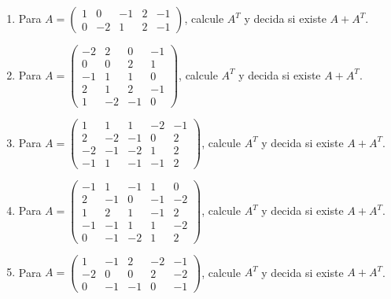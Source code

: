 \documentclass[12pt]{article}
\theoremstyle{remark}
\newcounter{contadorEjercicio}
\newenvironment{listaejercicios}{\begin{enumerate}[label=\textbf{E\arabic*.},leftmargin=2.4em,itemsep=0.52em]\setcounter{enumi}{\value{contadorEjercicio}}}{\setcounter{contadorEjercicio}{\value{enumi}}\end{enumerate}}
\begin{document}
\begin{listaejercicios}
\item Para $A=\begin{pmatrix}1&0&-1&2&-1\\0&-2&1&2&-1\end{pmatrix}$, calcule $A^T$ y decida si existe $A+A^T$.

\item Para $A=\begin{pmatrix}-2&2&0&-1\\0&0&2&1\\-1&1&1&0\\2&1&2&-1\\1&-2&-1&0\end{pmatrix}$, calcule $A^T$ y decida si existe $A+A^T$.

\item Para $A=\begin{pmatrix}1&1&1&-2&-1\\2&-2&-1&0&2\\-2&-1&-2&1&2\\-1&1&-1&-1&2\end{pmatrix}$, calcule $A^T$ y decida si existe $A+A^T$.

\item Para $A=\begin{pmatrix}-1&1&-1&1&0\\2&-1&0&-1&-2\\1&2&1&-1&2\\-1&-1&1&1&-2\\0&-1&-2&1&2\end{pmatrix}$, calcule $A^T$ y decida si existe $A+A^T$.

\item Para $A=\begin{pmatrix}1&-1&2&-2&-1\\-2&0&0&2&-2\\0&-1&-1&0&-1\end{pmatrix}$, calcule $A^T$ y decida si existe $A+A^T$.

\end{listaejercicios}
\end{document}
